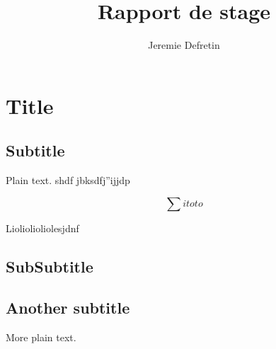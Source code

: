 \documentclass{article}
\title{Rapport de stage}
\author{Jeremie Defretin}
\begin{document}
 
\maketitle

\section{Title}

\subsection{Subtitle}

Plain text. shdf jbksdfj''ijjdp

$$ \sum{i}{toto} $$

Lioliolioliolesjdnf

\subsection{SubSubtitle}


\subsection{Another subtitle}

More plain text.
\end{document}
